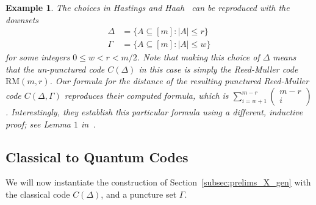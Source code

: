 \documentclass{article}
\newcounter{main}[section]
\newtheorem{example}[main]{Example}
\begin{document}
\begin{example}\label{example:hh_first}
    The choices in Hastings and Haah~\cite{hastings2018distillation} can be reproduced with the downsets
    \begin{align}
        \Delta &= \{A \subseteq [m]: |A| \leq r\}\\
        \Gamma &= \{A \subseteq [m]: |A| \leq w\}
    \end{align}
    for some integers $0\leq w<r<m/2$. Note that making this choice of $\Delta$ means that the un-punctured code $C(\Delta)$ in this case is simply the Reed-Muller code $\text{RM}(m,r)$. Our formula for the distance of the resulting punctured Reed-Muller code $C(\Delta, \Gamma)$ reproduces their computed formula, which is $\sum_{i=w+1}^{m-r}\left(\begin{smallmatrix}
        m-r\\i
    \end{smallmatrix}\right)$. Interestingly, they establish this particular formula using a different, inductive proof; see Lemma $1$ in~\cite{hastings2018distillation}.
\end{example}

\subsection{Classical to Quantum Codes}

We will now instantiate the construction of Section~\ref{subsec:prelims_X_gen} with the classical code $C(\Delta)$, and a puncture set $\Gamma$.
\end{document}
